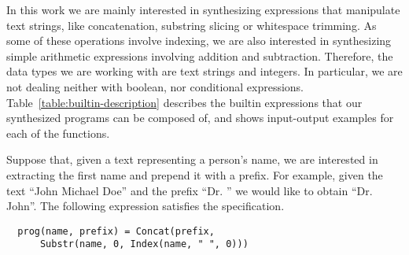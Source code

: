 
In this work we are mainly interested in synthesizing expressions that
manipulate text strings, like concatenation, substring slicing or whitespace
trimming. As some of these operations involve indexing, we are also interested
in synthesizing simple arithmetic expressions involving addition and
subtraction. Therefore, the data types we are working with are text strings and
integers. In particular, we are not dealing neither with boolean, nor conditional
expressions. Table~\ref{table:builtin-description} describes the builtin
expressions that our synthesized programs can be composed of, and shows
input-output examples for each of the functions.

\begin{example}\label{ex:first-name}
  Suppose that, given a text representing a person's name, we are interested in
extracting the first name and prepend it with a prefix. For example, given the
text ``John Michael Doe'' and the prefix ``Dr. '' we would like to obtain
``Dr. John''. The following expression satisfies the specification.
 
\begin{lstlisting}
  prog(name, prefix) = Concat(prefix,
      Substr(name, 0, Index(name, " ", 0)))
\end{lstlisting}
\end{example}

